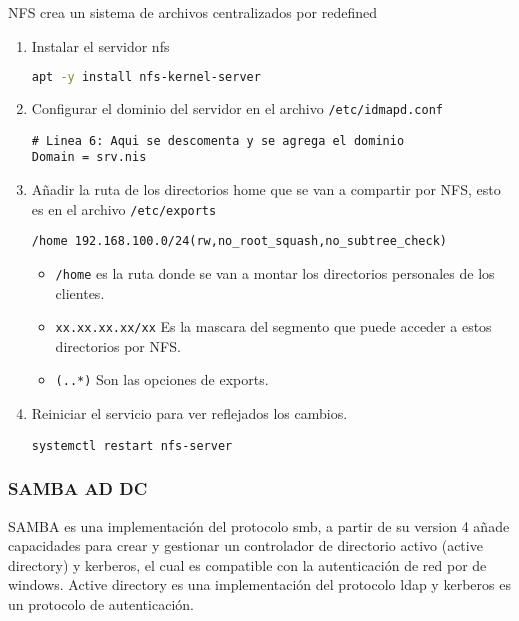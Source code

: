 \documentclass[../main.tex]{subfiles}
\begin{document}
NFS crea un sistema de archivos centralizados por redefined
\begin{enumerate}
\item Instalar el servidor nfs

  \begin{lstlisting}[language=bash]
apt -y install nfs-kernel-server
\end{lstlisting}

\item Configurar el dominio del servidor en el
  archivo \lstinline|/etc/idmapd.conf|

  \begin{lstlisting}
# Linea 6: Aqui se descomenta y se agrega el dominio
Domain = srv.nis
\end{lstlisting}

\item Añadir la ruta de los directorios home que se van a
  compartir por NFS, esto es en el archivo \lstinline|/etc/exports|

  \begin{lstlisting}
/home 192.168.100.0/24(rw,no_root_squash,no_subtree_check) 
\end{lstlisting}

  \begin{itemize}
  \item \lstinline|/home| es la ruta donde se van a montar
    los directorios personales de los clientes.
  \item \lstinline|xx.xx.xx.xx/xx| Es la mascara del segmento que
    puede acceder a estos directorios por NFS.\@
  \item \lstinline|(..*)| Son las opciones de exports.
  \end{itemize}

  
\item Reiniciar el servicio para ver reflejados los cambios.

  \begin{lstlisting}
systemctl restart nfs-server
\end{lstlisting}
  
\end{enumerate}

\subsubsection{SAMBA AD DC}\label{sec:samba_addc}

SAMBA es una implementación del protocolo smb, a partir de su
version 4 añade capacidades para crear y gestionar un controlador
de directorio activo (active directory) y kerberos, el cual es
compatible con la autenticación de red por de windows. Active
directory es una implementación del protocolo ldap y kerberos
es un protocolo de autenticación.
\end{document}
